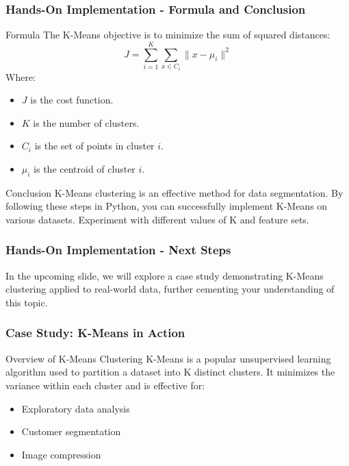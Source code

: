 \documentclass[aspectratio=169]{beamer}
\begin{document}
\begin{frame}[fragile]
    \frametitle{Hands-On Implementation - Formula and Conclusion}
    \begin{block}{Formula}
        The K-Means objective is to minimize the sum of squared distances:
        \begin{equation}
        J = \sum_{i=1}^{K} \sum_{x \in C_i} \| x - \mu_i \|^2 
        \end{equation}
        Where:
        \begin{itemize}
            \item \(J\) is the cost function.
            \item \(K\) is the number of clusters.
            \item \(C_i\) is the set of points in cluster \(i\).
            \item \(\mu_i\) is the centroid of cluster \(i\).
        \end{itemize}
    \end{block}
    \begin{block}{Conclusion}
        K-Means clustering is an effective method for data segmentation. By following these steps in Python, you can successfully implement K-Means on various datasets. Experiment with different values of K and feature sets.
    \end{block}
\end{frame}

\begin{frame}[fragile]
    \frametitle{Hands-On Implementation - Next Steps}
    In the upcoming slide, we will explore a case study demonstrating K-Means clustering applied to real-world data, further cementing your understanding of this topic.
\end{frame}

\begin{frame}[fragile]
    \frametitle{Case Study: K-Means in Action}
    \begin{block}{Overview of K-Means Clustering}
        K-Means is a popular unsupervised learning algorithm used to partition a dataset into K distinct clusters. 
        It minimizes the variance within each cluster and is effective for:
        \begin{itemize}
            \item Exploratory data analysis
            \item Customer segmentation
            \item Image compression
        \end{itemize}
    \end{block}
\end{frame}
\end{document}
